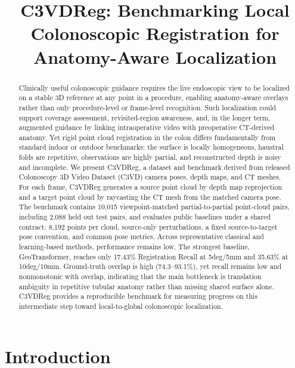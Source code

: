 \documentclass{bmvc2k}
\title{C3VDReg: Benchmarking Local Colonoscopic Registration for Anatomy-Aware Localization}
\begin{document}
\maketitle

\begin{abstract}
Clinically useful colonoscopic guidance requires the live endoscopic view to be localized on a stable 3D reference at any point in a procedure, enabling anatomy-aware overlays rather than only procedure-level or frame-level recognition. Such localization could support coverage assessment, revisited-region awareness, and, in the longer term, augmented guidance by linking intraoperative video with preoperative CT-derived anatomy. Yet rigid point cloud registration in the colon differs fundamentally from standard indoor or outdoor benchmarks: the surface is locally homogeneous, haustral folds are repetitive, observations are highly partial, and reconstructed depth is noisy and incomplete. We present C3VDReg, a dataset and benchmark derived from released Colonoscopy 3D Video Dataset (C3VD) camera poses, depth maps, and CT meshes. For each frame, C3VDReg generates a source point cloud by depth map reprojection and a target point cloud by raycasting the CT mesh from the matched camera pose. The benchmark contains 10,015 viewpoint-matched partial-to-partial point-cloud pairs, including 2,088 held out test pairs, and evaluates public baselines under a shared contract: 8,192 points per cloud, source-only perturbations, a fixed source-to-target pose convention, and common pose metrics. Across representative classical and learning-based methods, performance remains low. The strongest baseline, GeoTransformer, reaches only 17.43\% Registration Recall at 5deg/5mm and 35.63\% at 10deg/10mm. Ground-truth overlap is high (74.3--93.1\%), yet recall remains low and nonmonotonic with overlap, indicating that the main bottleneck is translation ambiguity in repetitive tubular anatomy rather than missing shared surface alone. C3VDReg provides a reproducible benchmark for measuring progress on this intermediate step toward local-to-global colonoscopic localization.
\end{abstract}

\section{Introduction}
\label{sec:intro}
\end{document}
